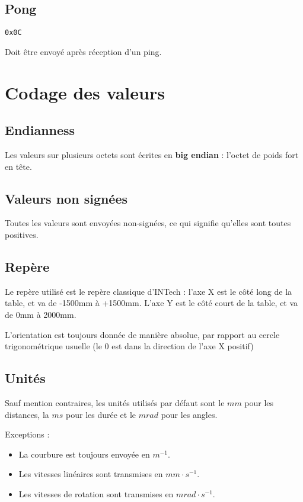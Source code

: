 \documentclass[a4paper, 12pt]{article}
\begin{document}
\subsection{Pong}
     \texttt{0x0C}

Doit être envoyé après réception d'un ping.

\section{Codage des valeurs}

\subsection{Endianness}

Les valeurs sur plusieurs octets sont écrites en \textbf{big endian} : l'octet de poids fort en tête.

\subsection{Valeurs non signées}

Toutes les valeurs sont envoyées non-signées, ce qui signifie qu'elles sont toutes positives.

\subsection{Repère}

Le repère utilisé est le repère classique d'INTech : l'axe X est le côté long de la table, et va de -1500mm à +1500mm. L'axe Y est le côté court de la table, et va de 0mm à 2000mm.

L'orientation est toujours donnée de manière absolue, par rapport au cercle trigonométrique usuelle (le 0 est dans la direction de l'axe X positif)

\subsection{Unités}

Sauf mention contraires, les unités utilisés par défaut sont le $mm$ pour les distances, la $ms$ pour les durée et le $mrad$ pour les angles.

Exceptions :
\begin{itemize}
\item La courbure est toujours envoyée en $m^{-1}$.
\item Les vitesses linéaires sont transmises en $mm \cdot s^{-1}$.
\item Les vitesses de rotation sont transmises en $mrad \cdot s^{-1}$.
\end{itemize}
\end{document}
